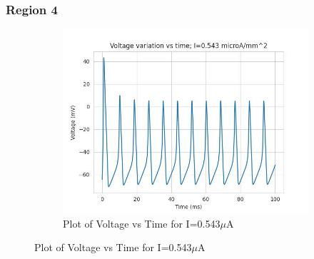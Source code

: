 \documentclass{article}
\begin{document}
\subsubsection{Region 4}

\begin{figure}[h]
    \centering
    \begin{subfigure}[b]{0.45\textwidth}
        \includegraphics[width=1.5\textwidth]{10.jpg}
        \caption{Plot of Voltage vs Time for I=0.543$\mu$A}
        \label{fig:IOU1}
    \end{subfigure}
    

\end{figure}
\end{document}
